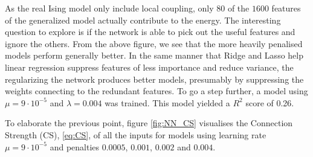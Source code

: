As the real Ising model only include local coupling, only $80$ of the $1600$ features of the generalized model actually contribute to the energy. The interesting question to explore is if the network is able to pick out the useful features and ignore the others. From the above figure, we see that the more heavily penalised models perform generally better. In the same manner that Ridge and Lasso help linear regression suppress features of less importance and reduce variance, the regularizing the network produces better models, presumably by suppressing the weights connecting to the redundant features. To go a step further, a model using $\mu = 9 \cdot 10^{-5}$ and $\lambda = 0.004$ was trained. This model yielded a $R^2$ score of 0.26. 

To elaborate the previous point, figure \autoref{fig:NN_CS} visualises the Connection Strength (CS), \autoref{eq:CS}, of all the inputs for models using learning rate $\mu = 9 \cdot 10^{-5}$ and penalties $0.0005$, $0.001$, $0.002$ and $0.004$. 

